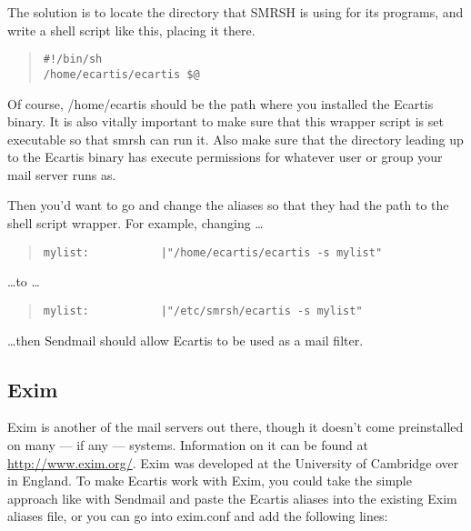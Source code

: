 \documentclass{book}
\begin{document}
The solution is to locate the directory that SMRSH is using for its programs,
and write a shell script like this, placing it there.
   
\begin{quote}
\footnotesize
\begin{verbatim}
#!/bin/sh
/home/ecartis/ecartis $@
\end{verbatim}
\end{quote}

Of course, /home/ecartis should be the path where you installed the Ecartis
binary.  It is also vitally important to make sure that this wrapper script is
set executable so that smrsh can run it.  Also make sure that the directory
leading up to the Ecartis binary has execute permissions for whatever user or
group your mail server runs as.
   
Then you'd want to go and change the aliases so that they had the path to the
shell script wrapper.  For example, changing \ldots
   
\begin{quote}   
\footnotesize
\begin{verbatim}
mylist:           |"/home/ecartis/ecartis -s mylist"
\end{verbatim}
\end{quote} 
   
\ldots to \ldots
   
\begin{quote}
\footnotesize
\begin{verbatim}
mylist:           |"/etc/smrsh/ecartis -s mylist"
\end{verbatim}
\end{quote}
   
\ldots then Sendmail should allow Ecartis to be used as a mail filter.
   
\subsection{Exim}
\label{starting:filters:exim}

Exim is another of the mail servers out there, though it doesn't come
preinstalled on many --- if any --- systems.  Information on it can be found
at \href{http://www.exim.org/}{http://www.exim.org/}.  Exim was developed at the University of
Cambridge over in England.  To make Ecartis work with Exim, you could take the
simple approach like with Sendmail and paste the Ecartis aliases into the
existing Exim aliases file, or you can go into exim.conf and add the following
lines:
   
\end{document}

